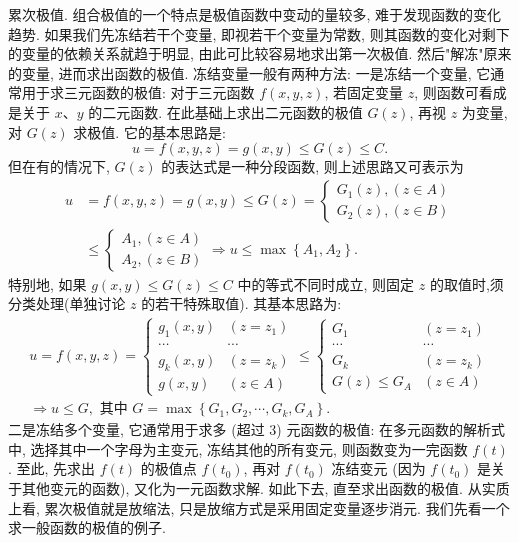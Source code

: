 
累次极值.
组合极值的一个特点是极值函数中变动的量较多, 难于发现函数的变化趋势.
如果我们先冻结若干个变量, 即视若干个变量为常数, 则其函数的变化对剩下的变量的依赖关系就趋于明显, 由此可比较容易地求出第一次极值.
然后"解冻"原来的变量, 进而求出函数的极值.
冻结变量一般有两种方法: 一是冻结一个变量, 它通常用于求三元函数的极值: 对于三元函数 $f(x, y, z)$, 若固定变量 $z$, 则函数可看成是关于 $x 、 y$ 的二元函数.
在此基础上求出二元函数的极值 $G(z)$, 再视 $z$ 为变量, 对 $G(z)$ 求极值.
它的基本思路是:
$$
u=f(x, y, z)=g(x, y) \leqslant G(z) \leqslant C .
$$
但在有的情况下, $G(z)$ 的表达式是一种分段函数, 则上述思路又可表示为
$$
\begin{aligned}
u & =f(x, y, z)=g(x, y) \leqslant G(z)=\left\{\begin{array}{l}
G_1(z),(z \in A) \\
G_2(z),(z \in B)
\end{array}\right. \\
& \leqslant\left\{\begin{array}{l}
A_1,(z \in A) \\
A_2,(z \in B)
\end{array} \Rightarrow u \leqslant \max \left\{A_1, A_2\right\} .\right.
\end{aligned}
$$
特别地, 如果 $g(x, y) \leqslant G(z) \leqslant C$ 中的等式不同时成立, 则固定 $z$ 的取值时,须分类处理(单独讨论 $z$ 的若干特殊取值). 其基本思路为:
$$
\begin{gathered}
u=f(x, y, z)=\left\{\begin{array}{cc}
g_1(x, y) & \left(z=z_1\right) \\
\cdots & \cdots \\
g_k(x, y) & \left(z=z_k\right) \\
g(x, y) & (z \in A)
\end{array} \leqslant\left\{\begin{array}{ccc}
G_1 & \left(z=z_1\right) \\
\cdots & \cdots \\
G_k & \left(z=z_k\right) \\
G(z) \leqslant G_A & (z \in A)
\end{array}\right.\right. \\
\Rightarrow u \leqslant G, \text { 其中 } G=\max \left\{G_1, G_2, \cdots, G_k, G_A\right\} .
\end{gathered}
$$
二是冻结多个变量, 它通常用于求多 (超过 3) 元函数的极值: 在多元函数的解析式中, 选择其中一个字母为主变元, 冻结其他的所有变元, 则函数变为一完函数 $f(t)$. 至此, 先求出 $f(t)$ 的极值点 $f\left(t_0\right)$, 再对 $f\left(t_0\right)$ 冻结变元 (因为 $f\left(t_0\right)$ 是关于其他变元的函数), 又化为一元函数求解.
如此下去, 直至求出函数的极值.
从实质上看, 累次极值就是放缩法, 只是放缩方式是采用固定变量逐步消元.
我们先看一个求一般函数的极值的例子.



